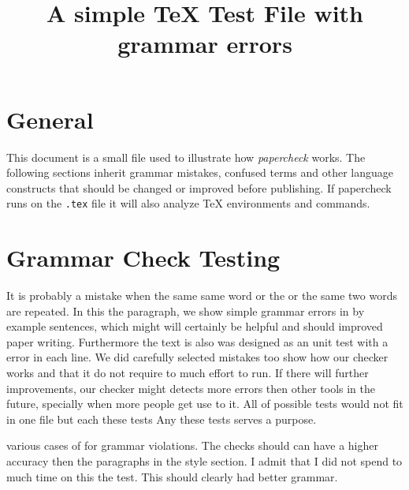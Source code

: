 \documentclass{scrartcl}
\title{A simple TeX Test File with grammar errors}
\begin{document}
\maketitle


\section{General}
This document is a small file used to illustrate how \emph{papercheck} works.
The following sections inherit grammar mistakes, confused terms and other language constructs that should be changed or improved before publishing.
If papercheck runs on the \verb!.tex! file it will also analyze TeX environments and commands.



\section{Grammar Check Testing}
It is probably a mistake when the same same word   %
or the or the same two words are repeated.         %
In this the paragraph, we show simple grammar      %
errors in by example sentences, which              %
might will certainly be helpful                    %
and should improved paper writing.                 %
Furthermore the text                               %
is also was designed as                            %
an unit test with                                  %
a error in each line.                              %
We did carefully selected mistakes                  %
too show how our checker works                     %
and that it do not require                         %
to much effort to run.                             %
If there will further improvements,                %
our checker might detects more 
errors then other tools in 
the future, specially when more 
people get use to it.
All of possible tests would not fit
in one file but each these tests
Any these tests serves a purpose.



various cases of for grammar violations.
The checks should can have a higher accuracy then the paragraphs in the style section.
I admit that I did not spend to much time on this the test.
This should clearly had better grammar.
\end{document}
